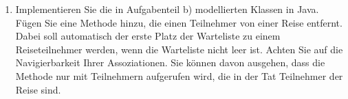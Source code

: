 \documentclass{bschlangaul-aufgabe}
\begin{document}
\begin{enumerate}

\item Implementieren Sie die in Aufgabenteil b) modellierten Klassen in
Java. Fügen Sie eine Methode hinzu, die einen Teilnehmer von einer Reise
entfernt. Dabei soll automatisch der erste Platz der Warteliste zu einem
Reiseteilnehmer werden, wenn die Warteliste nicht leer ist. Achten Sie
auf die Navigierbarkeit Ihrer Assoziationen. Sie können davon ausgehen,
dass die Methode nur mit Teilnehmern aufgerufen wird, die in der Tat
Teilnehmer der Reise sind.


\end{enumerate}
\end{document}
